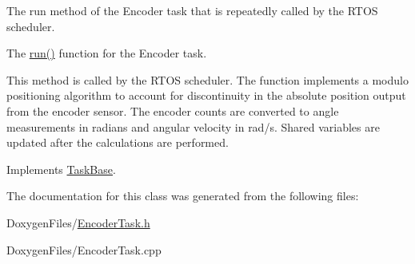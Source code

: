 The run method of the Encoder task that is repeatedly called by the R\+T\+OS scheduler. 

The {\ttfamily \mbox{\hyperlink{class_encoder_task_a4dfd013fe548038f941ab130adeb90fd}{run()}}} function for the Encoder task.

This method is called by the R\+T\+OS scheduler. The function implements a modulo positioning algorithm to account for discontinuity in the absolute position output from the encoder sensor. The encoder counts are converted to angle measurements in radians and angular velocity in rad/s. Shared variables are updated after the calculations are performed. 

Implements \mbox{\hyperlink{class_task_base_adcf6036ad9c860051ccf392ba5e7dbbc}{Task\+Base}}.



The documentation for this class was generated from the following files\+:\begin{DoxyCompactItemize}
\item 
Doxygen\+Files/\mbox{\hyperlink{_encoder_task_8h}{Encoder\+Task.\+h}}\item 
Doxygen\+Files/Encoder\+Task.\+cpp\end{DoxyCompactItemize}

